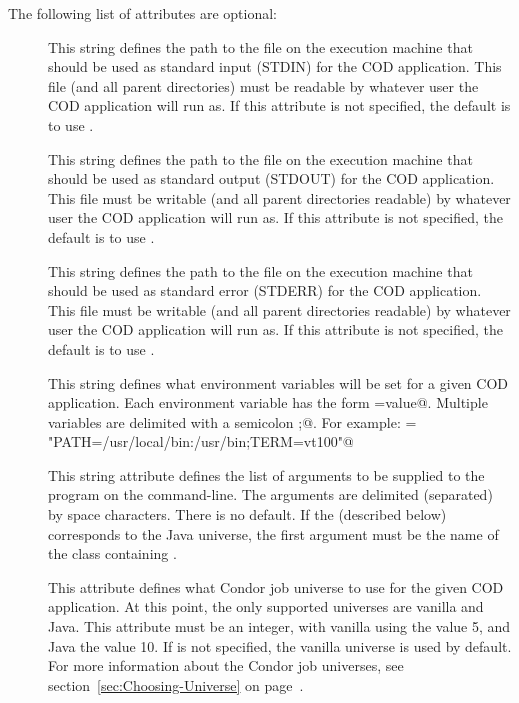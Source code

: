 
The following list of attributes are optional:

\begin{description}

 \item[] This string defines the path to the file on the
   execution machine that should be used as standard input (STDIN) for 
   the COD application.
   This file (and all parent directories) must be readable by whatever
   user the COD application will run as.
   If this attribute is not specified, the default is to use
   .
 
 \item[] This string defines the path to the file on the
   execution machine that should be used as standard output (STDOUT)
   for the COD application.
   This file must be writable (and all parent directories readable) by
   whatever user the COD application will run as.
   If this attribute is not specified, the default is to use
   .
 
 \item[] This string defines the path to the file on the
   execution machine that should be used as standard error (STDERR)
   for the COD application.
   This file must be writable (and all parent directories readable) by
   whatever user the COD application will run as.
   If this attribute is not specified, the default is to use
   .

 \item[] This string defines what environment variables will
   be set for a given COD application.
   Each environment variable has the form \verb@NAME=value@.
   Multiple variables are delimited with a semicolon \verb@;@.
   For example: \verb@Env = "PATH=/usr/local/bin:/usr/bin;TERM=vt100"@ 

 \item[] This string attribute defines the list of
   arguments to be supplied to the program on the command-line.
   The arguments are delimited (separated) by space characters. 
   There is no default. 
   If the  (described below) corresponds to the Java
   universe, the first argument must be the name of the class
   containing .

 \item[] This attribute defines what Condor job
   universe to use for the given COD application.
   At this point, the only supported universes are vanilla and Java.
   This attribute must be an integer, with vanilla using the value 5,
   and Java the value 10.
   If  is not specified, the vanilla universe is
   used by default.
   For more information about the Condor job universes, see
   section~\ref{sec:Choosing-Universe} on
   page~\pageref{sec:Choosing-Universe}. 


\end{description}
